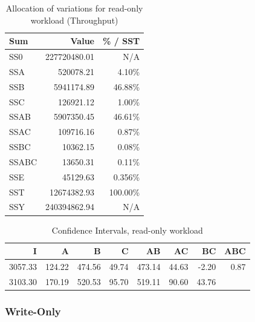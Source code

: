 \documentclass[11pt,a4paper]{article}
\begin{document}
\begin{table}[!htb]
  \centering
    \label{tab:2k_1_v}
    \caption{Allocation of variations for read-only workload (Throughput)}
  \label{tab:ro_variation}
  \small{
    \begin{tabular}{|l|r|r|}
        \hline \textbf{Sum}   & \textbf{Value}        & \textbf{\% / SST} \\
      \hline SS0   & 227720480.01 & N/A      \\
      \hline SSA   & 520078.21    & 4.10\%  \\
      \hline SSB   & 5941174.89   & 46.88\% \\
      \hline SSC   & 126921.12    & 1.00\% \\
      \hline SSAB  & 5907350.45   & 46.61\%  \\
      \hline SSAC  & 109716.16    & 0.87\%  \\
      \hline SSBC  & 10362.15     & 0.08\%  \\
      \hline SSABC & 13650.31     & 0.11\%  \\
      \hline SSE   & 45129.63     & 0.356\%  \\
      \hline SST   & 12674382.93  & 100.00\% \\
      \hline SSY   & 240394862.94 & N/A      \\
      \hline
    \end{tabular}
  }
\end{table}

\begin{table}[!htb]
\centering
    \caption{Confidence Intervals, read-only workload}
    \label{tab:2k_1_c}
    \begin{tabular}{|r|r|r|r|r|r|r|r|}
  \hline
         \textbf{I}        & \textbf{A}       & \textbf{B}       & \textbf{C}       & \textbf{AB}      & \textbf{AC}      &\textbf{BC}       & \textbf{ABC}    \\
  \hline
         3057.33 & 124.22 & 474.56 & 49.74 & 473.14 & 44.63 & -2.20 & 0.87 \\
        \hline 3103.30 & 170.19 & 520.53 & 95.70 & 519.11 & 90.60 & 43.76 &  \\
  \hline
\end{tabular}
\end{table}

\newpage
\subsubsection*{Write-Only}
\end{document}
